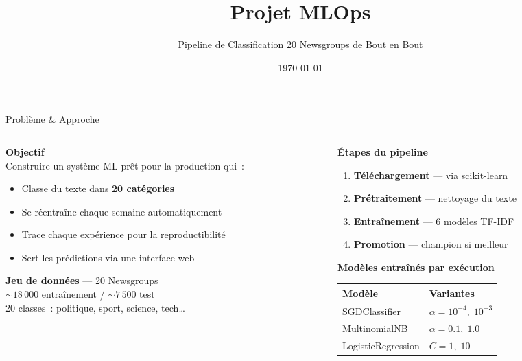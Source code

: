 \documentclass[aspectratio=169, 11pt]{beamer}
\title{Projet MLOps}
\subtitle{Pipeline de Classification 20 Newsgroups de Bout en Bout}
\author{}
\date{\today}
\institute{}
\begin{document}
\maketitle

\begin{frame}{Probl\`eme \& Approche}
\small
\begin{columns}[T]
\begin{column}{0.5\textwidth}
\textbf{Objectif}\\[3pt]
Construire un syst\`eme ML \alert{pr\^et pour la production} qui~:
\begin{itemize}\setlength{\itemsep}{1pt}
  \item Classe du texte dans \textbf{20 cat\'egories}
  \item Se r\'eentra\^ine chaque semaine automatiquement
  \item Trace chaque exp\'erience pour la reproductibilit\'e
  \item Sert les pr\'edictions via une interface web
\end{itemize}

\vspace{0.3em}
\textbf{Jeu de donn\'ees} — 20 Newsgroups\\[2pt]
{\footnotesize ${\sim}18\,000$ entra\^inement / ${\sim}7\,500$ test\\
20 classes~: politique, sport, science, tech\dots}
\end{column}

\begin{column}{0.46\textwidth}
\textbf{\'Etapes du pipeline}\\[3pt]
{\small
\begin{enumerate}\setlength{\itemsep}{1pt}
  \item \textbf{T\'el\'echargement} — via scikit-learn
  \item \textbf{Pr\'etraitement} — nettoyage du texte
  \item \textbf{Entra\^inement} — 6 mod\`eles TF-IDF
  \item \textbf{Promotion} — champion si meilleur
\end{enumerate}
}

\vspace{0.3em}
\textbf{Mod\`eles entra\^in\'es par ex\'ecution}\\[2pt]
{\footnotesize
\begin{tabular}{@{}ll@{}}
\toprule
\textbf{Mod\`ele} & \textbf{Variantes} \\
\midrule
SGDClassifier & $\alpha{=}10^{-4},\; 10^{-3}$ \\
MultinomialNB & $\alpha{=}0.1,\; 1.0$ \\
LogisticRegression & $C{=}1,\; 10$ \\
\bottomrule
\end{tabular}
}
\end{column}
\end{columns}
\end{frame}
\end{document}

